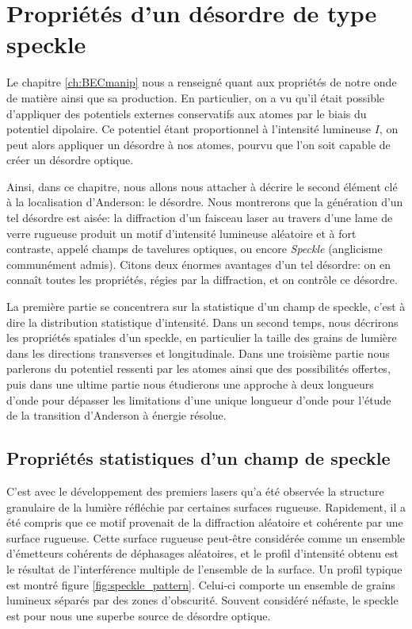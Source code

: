 \chapter{Propriétés d'un désordre de type speckle}

Le chapitre \ref{ch:BECmanip} nous a renseigné quant aux propriétés de notre onde de matière ainsi que sa production. En particulier, on a vu qu'il était possible d'appliquer des potentiels externes conservatifs aux atomes par le biais du potentiel dipolaire. Ce potentiel étant proportionnel à l'intensité lumineuse $I$, on peut alors appliquer un désordre à nos atomes, pourvu que l'on soit capable de créer un désordre optique. 

Ainsi, dans ce chapitre, nous allons nous attacher à décrire le second élément clé à la localisation d'Anderson: le désordre. Nous montrerons que la génération d'un tel désordre est aisée: la diffraction d'un faisceau laser au travers d'une lame de verre rugueuse produit un motif d'intensité lumineuse aléatoire et à fort contraste, appelé champs de tavelures optiques, ou encore \emph{Speckle} (anglicisme communément admis). Citons deux énormes avantages d'un tel désordre: on en connaît toutes les propriétés, régies par la diffraction, et on contrôle ce désordre. 

La première partie se concentrera sur la statistique d'un champ de speckle, c'est à dire la distribution statistique d'intensité. Dans un second temps, nous décrirons les propriétés spatiales d'un speckle, en particulier la taille des grains de lumière dans les directions transverses et longitudinale. Dans une troisième partie nous parlerons du potentiel ressenti par les atomes ainsi que des possibilités offertes, puis dans une ultime partie nous étudierons une approche à deux longueurs d'onde pour dépasser les limitations d'une unique longueur d'onde pour l'étude de la transition d'Anderson à énergie résolue.

\section{Propriétés statistiques d'un champ de speckle}
C'est avec le développement des premiers lasers qu'a été observée la structure granulaire de la lumière réfléchie par certaines surfaces rugueuse. Rapidement, il a été compris que ce motif provenait de la diffraction aléatoire et cohérente par une surface rugueuse. 
Cette surface rugueuse peut-être considérée comme un ensemble d'émetteurs cohérents de déphasages aléatoires, et le profil d'intensité obtenu est le résultat de l'interférence multiple de l'ensemble de la surface. Un profil typique est montré figure \ref{fig:speckle_pattern}. Celui-ci comporte un ensemble de grains lumineux séparés par des zones d'obscurité.
Souvent considéré néfaste, le speckle est pour nous une superbe source de désordre optique. 

